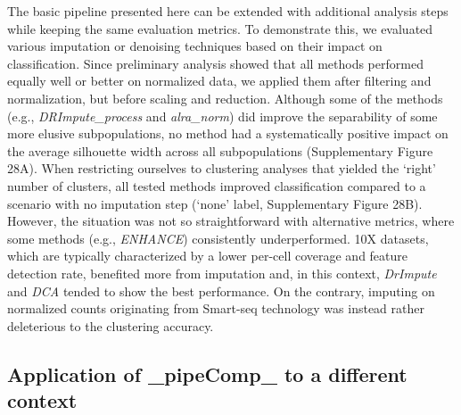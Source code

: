 \documentclass{bmcart}
\begin{document}
The basic pipeline presented here can be extended with additional analysis steps while keeping the same evaluation metrics. To demonstrate this, we evaluated various imputation or denoising techniques based on their impact on classification. Since preliminary analysis showed that all methods performed equally well or better on normalized data, we applied them after filtering and normalization, but before scaling and reduction. Although some of the methods (e.g., \textit{DRImpute\_process} and \textit{alra\_norm}) did improve the separability of some more elusive subpopulations, no method had a systematically positive impact on the average silhouette width across all subpopulations (Supplementary Figure 28A). When restricting ourselves to clustering analyses that yielded the `right' number of clusters, all tested methods improved classification  compared to a scenario with no imputation step (`none' label, Supplementary Figure 28B). However, the situation was not so straightforward with alternative metrics, where some methods (e.g., \textit{ENHANCE}) consistently underperformed. 10X datasets, which are typically characterized by a lower per-cell coverage and feature detection rate, benefited more from imputation and, in this context, \textit{DrImpute} and \textit{DCA} tended to show the best performance. On the contrary, imputing on normalized counts originating from Smart-seq technology was instead rather deleterious to the clustering accuracy. 

\subsection*{Application of _pipeComp_ to a different context}
\end{document}
